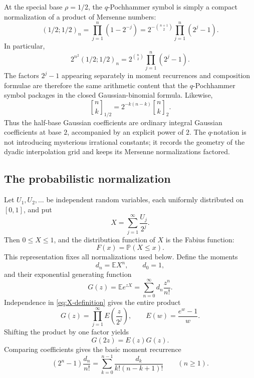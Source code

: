 \documentclass[11pt,oneside]{article}
\theoremstyle{definition}
\theoremstyle{remark}
\newcommand{\E}{\mathbb E}
\newcommand{\Prob}{\mathbb P}
\newcommand{\poch}[3]{\left(#1;#2\right)_{#3}}
\newcommand{\qbinom}[3]{\genfrac{[}{]}{0pt}{}{#1}{#2}_{#3}}
\begin{document}
At the special base $\rho=1/2$, the $q$-Pochhammer symbol is simply a compact
normalization of a product of Mersenne numbers:
\begin{equation}\label{eq:Mersenne-Pochhammer}
 \poch{1/2}{1/2}{n}
 =\prod_{j=1}^{n}(1-2^{-j})
 =2^{-\binom{n+1}{2}}\prod_{j=1}^{n}(2^j-1).
\end{equation}
In particular,
\begin{equation}\label{eq:main-denom-Mersenne}
 2^{n^2}\poch{1/2}{1/2}{n}
 =2^{\binom n2}\prod_{j=1}^{n}(2^j-1).
\end{equation}
The factors $2^j-1$ appearing separately in moment recurrences and
composition formulae are therefore the same arithmetic content that the
$q$-Pochhammer symbol packages in the closed Gaussian-binomial formula.
Likewise,
\begin{equation}\label{eq:qbinomial-inversion}
 \qbinom{n}{k}{1/2}
 =2^{-k(n-k)}\qbinom{n}{k}{2}.
\end{equation}
Thus the half-base Gaussian coefficients are ordinary integral Gaussian
coefficients at base $2$, accompanied by an explicit power of $2$.  The
$q$-notation is not introducing mysterious irrational constants; it records
the geometry of the dyadic interpolation grid and keeps its Mersenne
normalizations factored.

\subsection{The probabilistic normalization}

Let $U_1,U_2,\ldots$ be independent random variables, each uniformly
distributed on $[0,1]$, and put
\begin{equation}\label{eq:X-definition}
  X=\sum_{j=1}^{\infty}\frac{U_j}{2^j}.
\end{equation}
Then $0\le X\le1$, and the distribution function of $X$ is the Fabius
function:
\[
  F(x)=\Prob(X\le x).
\]
This representation fixes all normalizations used below.  Define the moments
\begin{equation}\label{eq:dn-definition}
  d_n=\E X^n,
  \qquad d_0=1,
\end{equation}
and their exponential generating function
\begin{equation}\label{eq:G-definition}
  G(z)=\E e^{zX}=\sum_{n=0}^{\infty}d_n\frac{z^n}{n!}.
\end{equation}
Independence in \eqref{eq:X-definition} gives the entire product
\begin{equation}\label{eq:G-product}
  G(z)=\prod_{j=1}^{\infty}E\!\left(\frac{z}{2^j}\right),
  \qquad
  E(w)=\frac{e^w-1}{w}.
\end{equation}
Shifting the product by one factor yields
\begin{equation}\label{eq:G-dilation}
  G(2z)=E(z)G(z).
\end{equation}
Comparing coefficients gives the basic moment recurrence
\begin{equation}\label{eq:moment-recurrence}
  (2^n-1)\frac{d_n}{n!}
  =\sum_{k=0}^{n-1}\frac{d_k}{k!(n-k+1)!}
  \qquad(n\ge1).
\end{equation}
\end{document}
